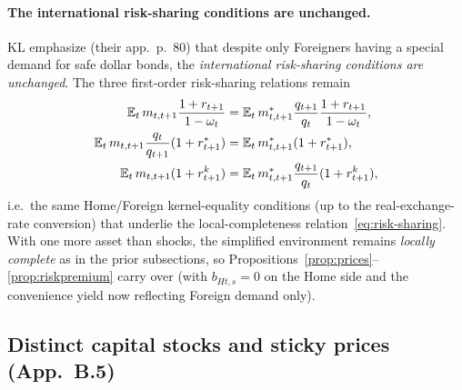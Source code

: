 \paragraph{The international risk-sharing conditions are unchanged.} KL emphasize
(their app.~p.~80) that despite only Foreigners having a special demand for safe
dollar bonds, the \emph{international risk-sharing conditions are unchanged}. The
three first-order risk-sharing relations remain
\begin{align}
\mathbb{E}_t\,m_{t,t+1}\frac{1+r_{t+1}}{1-\omega_t}
&= \mathbb{E}_t\,m^{*}_{t,t+1}\frac{q_{t+1}}{q_t}\frac{1+r_{t+1}}{1-\omega_t}, \label{eq:b4-rs-safe}\\
\mathbb{E}_t\,m_{t,t+1}\frac{q_t}{q_{t+1}}(1+r^{*}_{t+1})
&= \mathbb{E}_t\,m^{*}_{t,t+1}(1+r^{*}_{t+1}), \label{eq:b4-rs-fbond}\\
\mathbb{E}_t\,m_{t,t+1}(1+r^{k}_{t+1})
&= \mathbb{E}_t\,m^{*}_{t,t+1}\frac{q_{t+1}}{q_t}(1+r^{k}_{t+1}), \label{eq:b4-rs-cap}
\end{align}
i.e.\ the same Home/Foreign kernel-equality conditions (up to the
real-exchange-rate conversion) that underlie the local-completeness
relation~\eqref{eq:risk-sharing}. With one more asset than shocks, the simplified
environment remains \emph{locally complete} as in the prior subsections, so
Propositions~\ref{prop:prices}--\ref{prop:riskpremium} carry over (with
$b_{Ht,s}=0$ on the Home side and the convenience yield now reflecting Foreign
demand only).

\subsection{Distinct capital stocks and sticky prices (App.~B.5)}
\label{sec:b5}

